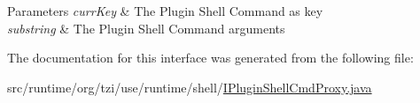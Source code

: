 \begin{DoxyParams}{Parameters}
{\em curr\-Key} & The Plugin Shell Command as key \\
\hline
{\em substring} & The Plugin Shell Command arguments \\
\hline
\end{DoxyParams}


The documentation for this interface was generated from the following file\-:\begin{DoxyCompactItemize}
\item 
src/runtime/org/tzi/use/runtime/shell/\hyperlink{_i_plugin_shell_cmd_proxy_8java}{I\-Plugin\-Shell\-Cmd\-Proxy.\-java}\end{DoxyCompactItemize}
